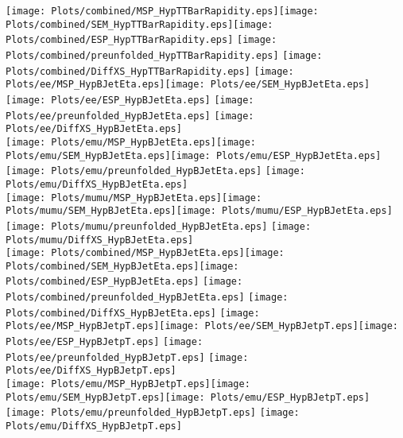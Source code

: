 \documentclass[a4paper,10pt]{article}
\begin{document}
\texttt{[image: Plots/combined/MSP\_HypTTBarRapidity.eps]}\texttt{[image: Plots/combined/SEM\_HypTTBarRapidity.eps]}\texttt{[image: Plots/combined/ESP\_HypTTBarRapidity.eps]} \texttt{[image: Plots/combined/preunfolded\_HypTTBarRapidity.eps]} \texttt{[image: Plots/combined/DiffXS\_HypTTBarRapidity.eps]}
\newpage
\texttt{[image: Plots/ee/MSP\_HypBJetEta.eps]}\texttt{[image: Plots/ee/SEM\_HypBJetEta.eps]}\texttt{[image: Plots/ee/ESP\_HypBJetEta.eps]} \texttt{[image: Plots/ee/preunfolded\_HypBJetEta.eps]} \texttt{[image: Plots/ee/DiffXS\_HypBJetEta.eps]}\\
\texttt{[image: Plots/emu/MSP\_HypBJetEta.eps]}\texttt{[image: Plots/emu/SEM\_HypBJetEta.eps]}\texttt{[image: Plots/emu/ESP\_HypBJetEta.eps]} \texttt{[image: Plots/emu/preunfolded\_HypBJetEta.eps]} \texttt{[image: Plots/emu/DiffXS\_HypBJetEta.eps]}\\
\texttt{[image: Plots/mumu/MSP\_HypBJetEta.eps]}\texttt{[image: Plots/mumu/SEM\_HypBJetEta.eps]}\texttt{[image: Plots/mumu/ESP\_HypBJetEta.eps]} \texttt{[image: Plots/mumu/preunfolded\_HypBJetEta.eps]} \texttt{[image: Plots/mumu/DiffXS\_HypBJetEta.eps]}\\
\texttt{[image: Plots/combined/MSP\_HypBJetEta.eps]}\texttt{[image: Plots/combined/SEM\_HypBJetEta.eps]}\texttt{[image: Plots/combined/ESP\_HypBJetEta.eps]} \texttt{[image: Plots/combined/preunfolded\_HypBJetEta.eps]} \texttt{[image: Plots/combined/DiffXS\_HypBJetEta.eps]}
\newpage
\texttt{[image: Plots/ee/MSP\_HypBJetpT.eps]}\texttt{[image: Plots/ee/SEM\_HypBJetpT.eps]}\texttt{[image: Plots/ee/ESP\_HypBJetpT.eps]} \texttt{[image: Plots/ee/preunfolded\_HypBJetpT.eps]} \texttt{[image: Plots/ee/DiffXS\_HypBJetpT.eps]}\\
\texttt{[image: Plots/emu/MSP\_HypBJetpT.eps]}\texttt{[image: Plots/emu/SEM\_HypBJetpT.eps]}\texttt{[image: Plots/emu/ESP\_HypBJetpT.eps]} \texttt{[image: Plots/emu/preunfolded\_HypBJetpT.eps]} \texttt{[image: Plots/emu/DiffXS\_HypBJetpT.eps]}\\
\end{document}
